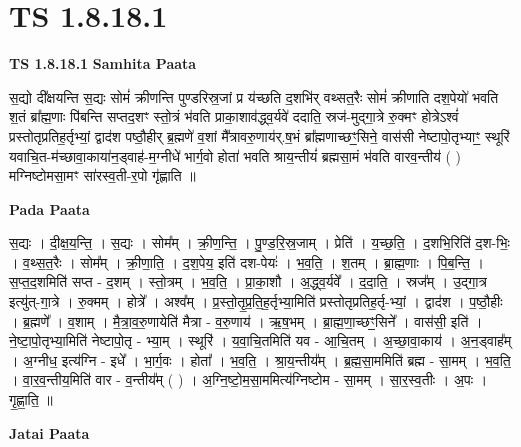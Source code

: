 \documentclass[17pt]{extarticle}
\begin{document}
\section*{ TS 1.8.18.1 }

\textbf{TS 1.8.18.1 } \newline
\textbf{Samhita Paata} \newline

स॒द्यो दी᳚क्षयन्ति स॒द्यः सोमं॑ क्रीणन्ति पुण्डरिस्र॒जां प्र य॑च्छति द॒शभि॑र् वथ्सत॒रैः सोमं॑ क्रीणाति दश॒पेयो॑ भवति श॒तं ब्रा᳚ह्म॒णाः पि॑बन्ति सप्तद॒शꣳ स्तो॒त्रं भ॑वति प्राका॒शाव॑द्ध्व॒र्यवे॑ ददाति॒ स्रज॑-मुद्गा॒त्रे रु॒क्मꣳ होत्रेऽश्वं॑ प्रस्तोतृप्रतिह॒र्तृभ्यां॒ द्वाद॑श पष्ठौ॒हीर् ब्र॒ह्मणे॑ व॒शां मै᳚त्रावरु॒णाय॑र्.ष॒भं ब्रा᳚ह्मणाच्छꣳ॒॒सिने॒ वास॑सी नेष्टापो॒तृभ्याꣳ॒॒ स्थूरि॑ यवाचि॒त-म॑च्छावा॒काया॑न॒ड्वाह॑-म॒ग्नीधे॑ भार्ग॒वो होता॑ भवति श्राय॒न्तीयं॑ ब्रह्मसा॒मं भ॑वति वारव॒न्तीय॑ ( ) मग्निष्टोमसा॒मꣳ सा॑रस्व॒ती-र॒पो गृ॑ह्णाति ॥ \newline

\textbf{Pada Paata} \newline

स॒द्यः । दी॒क्ष॒य॒न्ति॒ । स॒द्यः । सोम᳚म् । क्री॒ण॒न्ति॒ । पु॒ण्ड॒रि॒स्र॒जाम् । प्रेति॑ । य॒च्छ॒ति॒ । द॒शभि॒रिति॑ द॒श-भिः॒ । व॒थ्स॒त॒रैः । सोम᳚म् । क्री॒णा॒ति॒ । द॒श॒पेय॒ इति॑ दश-पेयः॑ । भ॒व॒ति॒ । श॒तम् । ब्रा॒ह्म॒णाः । पि॒ब॒न्ति॒ । स॒प्त॒द॒शमिति॑ सप्त - द॒शम् । स्तो॒त्रम् । भ॒व॒ति॒ । प्रा॒का॒शौ । अ॒द्ध्व॒र्यवे᳚ । द॒दा॒ति॒ । स्रज᳚म् । उ॒द्गा॒त्र इत्यु॑त्-गा॒त्रे । रु॒क्मम् । होत्रे᳚ । अश्व᳚म् । प्र॒स्तो॒तृ॒प्र॒ति॒ह॒र्तृभ्या॒मिति॑ प्रस्तोतृप्रतिह॒र्तृ-भ्यां॒ । द्वाद॑श । प॒ष्ठौ॒हीः । ब्र॒ह्मणे᳚ । व॒शाम् । मै॒त्रा॒व॒रु॒णायेति॑ मैत्रा - व॒रु॒णाय॑ । ऋ॒ष॒भम् । ब्रा॒ह्म॒णा॒च्छꣳ॒॒सिने᳚ । वास॑सी॒ इति॑ । ने॒ष्टा॒पो॒तृभ्या॒मिति॑ नेष्टापो॒तृ - भ्या॒म् । स्थूरि॑ । य॒वा॒चि॒तमिति॑ यव - आ॒चि॒तम् । अ॒च्छा॒वा॒काय॑ । अ॒न॒ड्वाह᳚म् । अ॒ग्नीध॒ इत्य॑ग्नि - इधे᳚ । भा॒र्ग॒वः । होता᳚ । भ॒व॒ति॒ । श्रा॒य॒न्तीय᳚म् । ब्र॒ह्म॒सा॒ममिति॑ ब्रह्म - सा॒मम् । भ॒व॒ति॒ । वा॒र॒व॒न्तीय॒मिति॑ वार - व॒न्तीय᳚म् ( ) । अ॒ग्नि॒ष्टो॒म॒सा॒ममित्य॑ग्निष्टोम - सा॒मम् । सा॒र॒स्व॒तीः । अ॒पः । गृ॒ह्णा॒ति॒ ॥  \newline



\textbf{Jatai Paata} \newline
\end{document}
